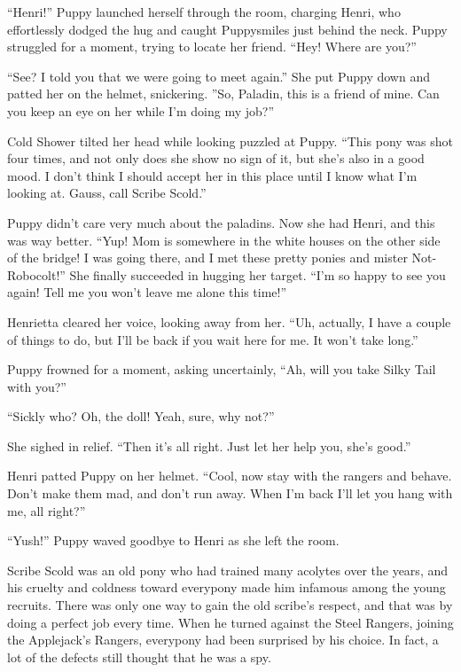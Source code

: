 ``Henri!'' Puppy launched herself through the room, charging Henri, who effortlessly dodged the hug and caught Puppysmiles just behind the neck. Puppy struggled for a moment, trying to locate her friend. ``Hey! Where are you?''

``See? I told you that we were going to meet again.'' She put Puppy down and patted her on the helmet, snickering. ''So, Paladin, this is a friend of mine. Can you keep an eye on her while I'm doing my job?''

Cold Shower tilted her head while looking puzzled at Puppy. ``This pony was shot four times, and not only does she show no sign of it, but she's also in a good mood. I don't think I should accept her in this place until I know what I'm looking at. Gauss, call Scribe Scold.''

Puppy didn't care very much about the paladins. Now she had Henri, and this was way better. ``Yup! Mom is somewhere in the white houses on the other side of the bridge! I was going there, and I met these pretty ponies and mister Not-Robocolt!'' She finally succeeded in hugging her target. ``I'm so happy to see you again! Tell me you won't leave me alone this time!''

Henrietta cleared her voice, looking away from her. ``Uh, actually, I have a couple of things to do, but I'll be back if you wait here for me. It won't take long.''

Puppy frowned for a moment, asking uncertainly, ``Ah, will you take Silky Tail with you?''

``Sickly who? Oh, the doll! Yeah, sure, why not?''

She sighed in relief. ``Then it's all right. Just let her help you, she's good.''

Henri patted Puppy on her helmet. ``Cool, now stay with the rangers and behave. Don't make them mad, and don't run away. When I'm back I'll let you hang with me, all right?''

``Yush!'' Puppy waved goodbye to Henri as she left the room.



\horizonline


Scribe Scold was an old pony who had trained many acolytes over the years, and his cruelty and coldness toward everypony made him infamous among the young recruits. There was only one way to gain the old scribe's respect, and that was by doing a perfect job every time. When he turned against the Steel Rangers, joining the Applejack's Rangers, everypony had been surprised by his choice. In fact, a lot of the defects still thought that he was a spy.

